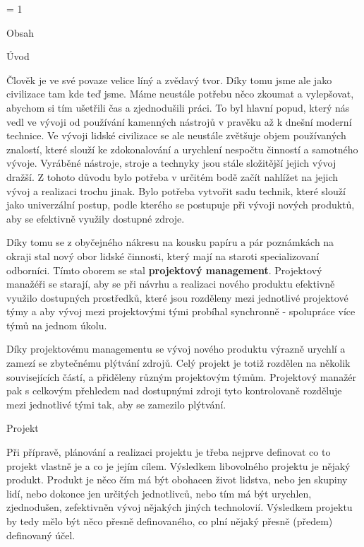 



\pageno = 1

\nonum\notoc\sec Obsah

\maketoc

\vfill\break

\pagenumbers


\chap Úvod

Člověk je ve své povaze velice líný a zvědavý tvor. Díky tomu jsme ale jako civilizace tam kde teď jsme. Máme neustále potřebu něco zkoumat a vylepšovat, abychom si tím ušetřili čas a zjednodušili práci. To byl hlavní popud, který nás vedl ve vývoji od používání kamenných nástrojů v pravěku až k dnešní moderní technice. Ve vývoji lidské civilizace se ale neustále zvětšuje objem používaných znalostí, které slouží ke zdokonalování a urychlení nespočtu činností a samotného vývoje. Vyráběné nástroje, stroje a technyky jsou stále složitější jejich vývoj dražší. Z tohoto důvodu bylo potřeba v určitém bodě začít nahlížet na jejich vývoj a realizaci trochu jinak. Bylo potřeba vytvořit sadu technik, které slouží jako univerzální postup, podle kterého se postupuje při vývoji nových produktů, aby se efektivně využily dostupné zdroje.

Díky tomu se z obyčejného nákresu na kousku papíru a pár poznámkách na okraji stal nový obor lidské činnosti, který mají na staroti specializovaní odborníci. Tímto oborem se stal {\bf projektový management}. Projektový manažéři se starají, aby se při návrhu a realizaci nového produktu efektivně využilo dostupných prostředků, které jsou rozděleny mezi jednotlivé projektové týmy a aby vývoj mezi projektovými tými probíhal synchronně - spolupráce více týmů na jednom úkolu.

Díky projektovému managementu se vývoj nového produktu výrazně ury\-chlí a zamezí se zbytečnému plýtvání zdrojů. Celý projekt je totiž rozdělen na několik souvisejících částí, a přiděleny různým projektovým týmům. Projektový manažér pak s celkovým přehledem nad dostupnými zdroji tyto kontrolovaně rozděluje mezi jednotlivé tými tak, aby se zamezilo plýtvání.


\chap Projekt

Při přípravě, plánování a realizaci projektu je třeba nejprve definovat co to projekt vlastně je a co je jejím cílem. Výsledkem libovolného projektu je nějaký produkt. Produkt je něco čím má být obohacen život lidstva, nebo jen skupiny lidí, nebo dokonce jen určitých jednotlivců, nebo tím má být urychlen, zjednodušen, zefektivněn vývoj nějakých jiných technolovií. Výsledkem projektu by tedy mělo být něco přesně definovaného, co plní nějaký přesně (předem) definovaný účel.

